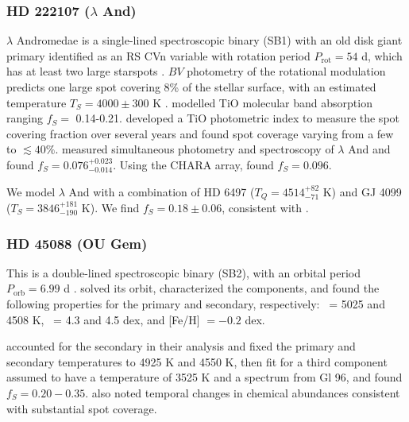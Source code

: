\subsubsection{HD 222107 ($\lambda$ And)} \label{sec:lamand}

$\lambda$ Andromedae is a single-lined spectroscopic binary (SB1) with an old disk giant primary identified as an RS CVn variable with rotation period $P_\mathrm{rot} = 54$ d, which has at least two large starspots \citep{Calder1938, Landis1978, Bopp1980, Poe1985, Padmakar1999, Drake2011, Pandey2012, Parks2014}. $BV$ photometry of the rotational modulation predicts one large spot covering 8\% of the stellar surface, with an estimated temperature $T_S = 4000 \pm 300$ K \citep{Donati1995}. \citet{oneal1998} modelled TiO molecular band absorption %
ranging $f_S =$ 0.14-0.21. \citet{Mirtorabi2003} developed a TiO photometric index to measure the spot covering fraction over several years and found spot coverage varying from a few to $\lesssim 40\%$. \citet{Frasca2008} measured simultaneous photometry and spectroscopy of $\lambda$ And and found $f_S = 0.076^{+0.023}_{-0.014}$. Using the CHARA array, \citet{Parks2014} found $f_S = 0.096$.

We model $\lambda$ And with a combination of HD 6497 ($T_Q = 4514^{+82}_{-71}$ K) and GJ 4099 ($T_S = 3846^{+181}_{-190}$ K). We find $f_S = 0.18 \pm 0.06$, consistent with \citet{Donati1995, oneal1998, Donati2003, Frasca2008, Parks2014}. %


\subsubsection{HD 45088 (OU Gem)}
This is a double-lined spectroscopic binary (SB2), with an orbital period 
$P_\mathrm{orb} = 6.99$ d \citep{Griffin1975, Bopp1980}.
\citet{Glazunova2014} solved its orbit, characterized the components, and found the following properties 
for the primary and secondary, respectively:
\teff\ = 5025 and 4508 K,
\logg\ = 4.3 and 4.5 dex, 
and [Fe/H] $= -0.2$ dex.

\citet{ONeal2001} accounted for the secondary in their analysis and fixed the primary and secondary temperatures to 
4925 K and 4550 K, then fit for a third component assumed to have a temperature of 
3525 K and a spectrum from Gl 96, 
and found $f_S = 0.20-0.35$. 
\citet{Glazunova2014} also noted temporal changes in chemical abundances consistent with substantial spot coverage. 

